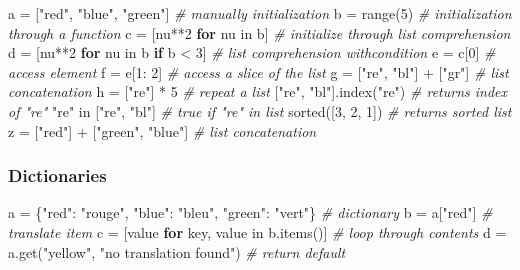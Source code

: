 \documentclass[]{article}
\newenvironment{Shaded}{}{}
\newcommand{\KeywordTok}[1]{\textcolor[rgb]{0.00,0.44,0.13}{\textbf{{#1}}}}
\newcommand{\DataTypeTok}[1]{\textcolor[rgb]{0.56,0.13,0.00}{{#1}}}
\newcommand{\DecValTok}[1]{\textcolor[rgb]{0.25,0.63,0.44}{{#1}}}
\newcommand{\StringTok}[1]{\textcolor[rgb]{0.25,0.44,0.63}{{#1}}}
\newcommand{\CommentTok}[1]{\textcolor[rgb]{0.38,0.63,0.69}{\textit{{#1}}}}
\newcommand{\NormalTok}[1]{{#1}}
\begin{document}
\begin{Shaded}
\begin{Highlighting}[]
\NormalTok{a = [}\StringTok{"red"}\NormalTok{, }\StringTok{"blue"}\NormalTok{, }\StringTok{"green"}\NormalTok{] }\CommentTok{# manually initialization}
\NormalTok{b = }\DataTypeTok{range}\NormalTok{(}\DecValTok{5}\NormalTok{) }\CommentTok{# initialization through a function}
\NormalTok{c = [nu**}\DecValTok{2} \KeywordTok{for} \NormalTok{nu in b] }\CommentTok{# initialize through list comprehension}
\NormalTok{d = [nu**}\DecValTok{2} \KeywordTok{for} \NormalTok{nu in b }\KeywordTok{if} \NormalTok{b < }\DecValTok{3}\NormalTok{] }\CommentTok{# list comprehension withcondition}
\NormalTok{e = c[}\DecValTok{0}\NormalTok{] }\CommentTok{# access element}
\NormalTok{f = e[}\DecValTok{1}\NormalTok{: }\DecValTok{2}\NormalTok{] }\CommentTok{# access a slice of the list}
\NormalTok{g = [}\StringTok{"re"}\NormalTok{, }\StringTok{"bl"}\NormalTok{] + [}\StringTok{"gr"}\NormalTok{] }\CommentTok{# list concatenation}
\NormalTok{h = [}\StringTok{"re"}\NormalTok{] * }\DecValTok{5} \CommentTok{# repeat a list}
\NormalTok{[}\StringTok{"re"}\NormalTok{, }\StringTok{"bl"}\NormalTok{].index(}\StringTok{"re"}\NormalTok{) }\CommentTok{# returns index of "re"}
\StringTok{"re"} \NormalTok{in [}\StringTok{"re"}\NormalTok{, }\StringTok{"bl"}\NormalTok{] }\CommentTok{# true if "re" in list}
\DataTypeTok{sorted}\NormalTok{([}\DecValTok{3}\NormalTok{, }\DecValTok{2}\NormalTok{, }\DecValTok{1}\NormalTok{]) }\CommentTok{# returns sorted list}
\NormalTok{z = [}\StringTok{"red"}\NormalTok{] + [}\StringTok{"green"}\NormalTok{, }\StringTok{"blue"}\NormalTok{] }\CommentTok{# list concatenation}
\end{Highlighting}
\end{Shaded}

\subsubsection{Dictionaries}

\begin{Shaded}
\begin{Highlighting}[]
\NormalTok{a = \{}\StringTok{"red"}\NormalTok{: }\StringTok{"rouge"}\NormalTok{, }\StringTok{"blue"}\NormalTok{: }\StringTok{"bleu"}\NormalTok{, }\StringTok{"green"}\NormalTok{: }\StringTok{"vert"}\NormalTok{\} }\CommentTok{# dictionary}
\NormalTok{b = a[}\StringTok{"red"}\NormalTok{] }\CommentTok{# translate item}
\NormalTok{c = [value }\KeywordTok{for} \NormalTok{key, value in b.items()] }\CommentTok{# loop through contents}
\NormalTok{d = a.get(}\StringTok{"yellow"}\NormalTok{, }\StringTok{"no translation found"}\NormalTok{) }\CommentTok{# return default}
\end{Highlighting}
\end{Shaded}
\end{document}
